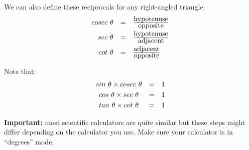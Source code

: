 We can also define these reciprocals for any right-angled triangle:
\begin{equation*}
\begin{array}{ccc}\hfill cosec~ \theta & =& \frac{\mbox{hypotenuse}}{\mbox{opposite}}\hfill \vspace{3pt}\\
 \hfill sec~ \theta & =& \frac{\mbox{hypotenuse}}{\mbox{adjacent}}\hfill \vspace{3pt}\\
 \hfill cot~ \theta & =& \frac{\mbox{adjacent}}{\mbox{opposite}}\hfill 
\end{array}
\end{equation*}

Note that:
\begin{equation*}
\begin{array}{ccc}sin~ \theta \times cosec~ \theta & =& 1 \vspace{3pt}\\
 cos~ \theta \times sec~ \theta & =& 1 \vspace{3pt}\\
tan~ \theta \times cot~ \theta & =& 1
\end{array}
\end{equation*}

\par
{}
% 
% 
% 
% 
\par
\textbf{Important:} most scientific calculators are quite similar but these steps might differ depending on the calculator you use. Make sure your calculator is in ``degrees'' mode.


